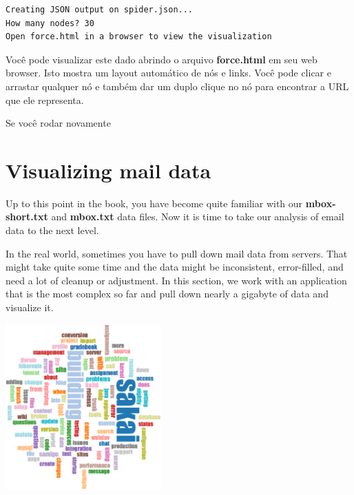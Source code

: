 \beforeverb
\begin{verbatim}
Creating JSON output on spider.json...
How many nodes? 30
Open force.html in a browser to view the visualization
\end{verbatim}
\afterverb
%

Você pode visualizar este dado abrindo o arquivo {\bf force.html} em seu web 
browser. Isto mostra um layout automático de nós e links. Você pode clicar e
arrastar qualquer nó e também dar um duplo clique no nó para encontrar a URL
que ele representa.

Se você rodar novamente

\section{Visualizing mail data}

Up to this point in the book, you have become quite familiar with our 
{\bf mbox-short.txt} and {\bf mbox.txt} data files.   Now it is time to take
our analysis of email data to the next level.  

In the real world, sometimes you have to pull down mail data from servers.
That might take quite some time and the data might be inconsistent, 
error-filled, and need a lot of cleanup or adjustment.  In this section, we
work with an application that is the most complex so far and pull down nearly a 
gigabyte of data and visualize it.

\beforefig
\centerline{\includegraphics[height=2.50in]{figs2/wordcloud.eps}}
\afterfig

